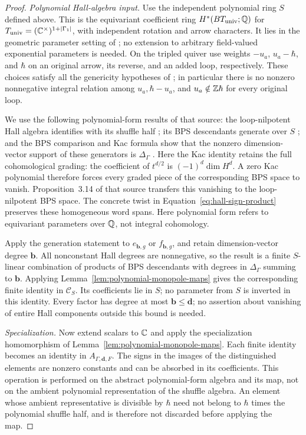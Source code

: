 \begin{proof}
\emph{Polynomial Hall-algebra input.}
Use the independent polynomial ring \(S\) defined above.  This is
the equivariant coefficient ring $H^*(BT_{\mathrm{univ}};\mathbb Q)$ for
$T_{\mathrm{univ}}=(\mathbb C^\times)^{1+|\Gamma_1|}$, with independent
rotation and arrow characters.  It lies in the geometric parameter
setting of \cite[Equation~(30) and Remark~2.6]{JindalNegut26}; no
extension to arbitrary field-valued exponential parameters is needed.
On the
tripled quiver use weights \(-u_a\), \(u_a-\hbar\), and \(\hbar\)
on an original arrow, its reverse, and an added loop, respectively.
These choices satisfy all the genericity hypotheses of
\cite[\S2.2]{JindalNegut26}; in particular there is no nonzero
nonnegative integral relation among \(u_a,\hbar-u_a\), and
\(u_a\notin\mathbb Z\hbar\) for every original loop.

We use the following polynomial-form results of that source:
the loop-nilpotent Hall algebra identifies with its shuffle half
\cite[Proposition~3.7]{JindalNegut26};
its BPS descendants generate over \(S\)
\cite[Theorem~3.10, Equation~(109), and
Corollary~3.15]{JindalNegut26};
and the BPS comparison and Kac formula show that the nonzero
dimension-vector support of these generators is \(\Delta_\Gamma\)
\cite[Proposition~3.14 and \S3.10]{JindalNegut26}.
Here the Kac identity retains the full cohomological grading: the
coefficient of $t^{d/2}$ is $(-1)^d\dim H^d$.
A zero Kac polynomial therefore forces every graded piece of the
corresponding BPS space to vanish.  Proposition~3.14 of that source
transfers this vanishing to the loop-nilpotent BPS space.
The concrete twist in Equation~\eqref{eq:hall-sign-product} preserves
these homogeneous word spans.
Here polynomial form refers to equivariant parameters over \(\mathbb Q\),
not integral cohomology.

Apply the generation statement to \(e_{\mathbf b,g}\) or
\(f_{\mathbf b,g}\), and retain dimension-vector degree \(\mathbf b\).
All nonconstant Hall degrees are nonnegative, so the result is a
finite \(S\)-linear combination of products of BPS descendants with
degrees in \(\Delta_\Gamma\) summing to \(\mathbf b\).
Applying Lemma~\ref{lem:polynomial-monopole-maps} gives the corresponding
finite identity in \(\mathcal C_S\).
Its coefficients lie in \(S\); no parameter from \(S\) is inverted
in this identity.
Every factor has degree at most \(\mathbf b\leq\mathbf d\); no assertion
about vanishing of entire Hall components outside this bound is needed.

\emph{Specialization.}
Now extend scalars to \(\mathbb C\) and apply the specialization homomorphism
of Lemma~\ref{lem:polynomial-monopole-maps}.
Each finite identity becomes an identity in \(A_{\Gamma,\mathbf d,F}\).
The signs in the images of the distinguished elements are nonzero
constants and can be absorbed in its coefficients.
This operation is performed on the abstract polynomial-form algebra and
its map, not on the ambient polynomial representation of the shuffle
algebra.  An element whose ambient representative is divisible by
\(\hbar\) need not belong to \(\hbar\) times the polynomial shuffle
half, and is therefore not discarded before applying the map.


\end{proof}
